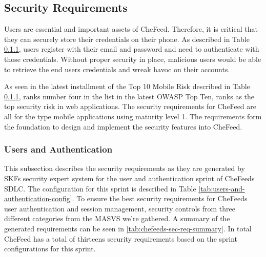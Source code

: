 \subsection{Security Requirements}\label{subsec:sec-req}
Users are essential and important assets of CheFeed. Therefore, it is critical that they can securely store their credentials on their phone. As described in Table \ref{}, users register with their email and password and need to authenticate with those credentials. Without proper security in place, malicious users would be able to retrieve the end users credentials and wreak havoc on their accounts. 

As seen in the latest installment of the Top 10 Mobile Risk described in Table \ref{},  ranks number four in the list in the latest OWASP Top Ten,  ranks as the top security risk in web applications. The security requirements for CheFeed are all for the type mobile applications using maturity level 1. The requirements form the foundation to design and implement the security features into CheFeed.

\subsubsection{Users and Authentication}
This subsection describes the security requirements as they are generated by SKFs security expert system for the user and authentication sprint of CheFeeds SDLC. The configuration for this sprint is described in Table \ref{tab:users-and-authentication-config}. To ensure the best security requirements for CheFeeds user authentication and session management, security controls from three different categories from the MASVS we're gathered. A summary of the generated requirements can be seen in \ref{tab:chefeeds-sec-req-summary}. In total CheFeed has a total of thirteens security requirements based on the sprint configurations for this sprint.

